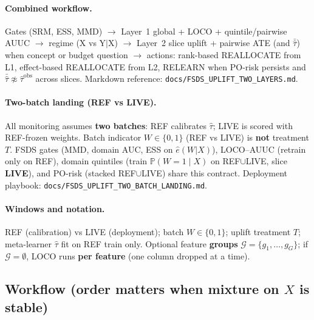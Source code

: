 \paragraph{Combined workflow.}
Gates (SRM, ESS, MMD) $\rightarrow$ Layer~1 global + LOCO + quintile/pairwise AUUC $\rightarrow$ regime (X vs Y$|$X) $\rightarrow$ Layer~2 slice uplift + pairwise ATE (and $\bar{\hat\tau}$) when concept or budget question $\rightarrow$ actions: rank-based REALLOCATE from L1, effect-based REALLOCATE from L2, RELEARN when PO-risk persists and $\bar{\hat\tau}\not\approx\widehat{\tau}^{\mathrm{obs}}$ across slices.
Markdown reference: \verb|docs/FSDS_UPLIFT_TWO_LAYERS.md|.

\paragraph{Two-batch landing (REF vs LIVE).}
All monitoring assumes \textbf{two batches}: REF calibrates $\hat\tau$; LIVE is scored with REF-frozen weights.
Batch indicator $W\in\{0,1\}$ (REF vs LIVE) is \textbf{not} treatment $T$.
FSDS gates (MMD, domain AUC, ESS on $\hat e(W|X)$), LOCO--AUUC (retrain only on REF), domain quintiles (train $\mathbb P(W{=}1\mid X)$ on REF$\cup$LIVE, slice \textbf{LIVE}), and PO-risk (stacked REF$\cup$LIVE) share this contract.
Deployment playbook: \verb|docs/FSDS_UPLIFT_TWO_BATCH_LANDING.md|.

\paragraph{Windows and notation.}
REF (calibration) vs LIVE (deployment); batch $W\in\{0,1\}$; uplift treatment $T$; meta-learner $\hat\tau$ fit on REF train only.
Optional feature \textbf{groups} $\mathcal{G}=\{g_1,\ldots,g_G\}$; if $\mathcal{G}=\emptyset$, LOCO runs \textbf{per feature} (one column dropped at a time).

\subsection{Workflow (order matters when mixture on $X$ is stable)}

